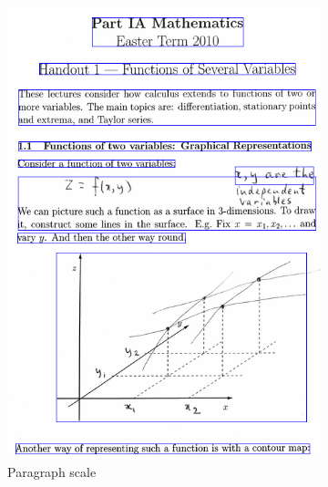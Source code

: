 \begin{figure}[!ht]
\begin{subfigure}{.42\textwidth}
    \includegraphics[width=\textwidth]{pla-par.png}
    \caption{Paragraph scale}
  \end{subfigure}%
  \qquad
  \begin{subfigure}{.42\textwidth}

\end{subfigure}
\end{figure}
